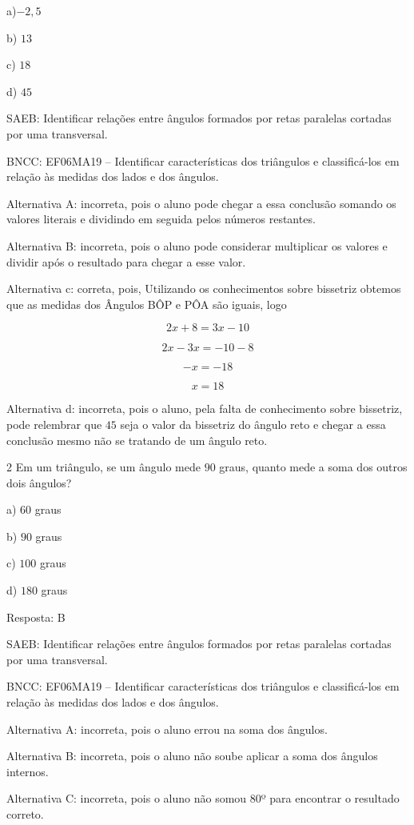 a)$-2,5$

b) $13$

c) $18$

d) $45$

SAEB: Identificar relações entre ângulos formados por retas paralelas
cortadas por uma transversal.

BNCC: EF06MA19 -- Identificar características dos triângulos e
classificá-los em relação às medidas dos lados e dos ângulos.

Alternativa A: incorreta, pois o aluno pode chegar a essa conclusão
somando os valores literais e dividindo em seguida pelos números
restantes.

Alternativa B: incorreta, pois o aluno pode considerar multiplicar os
valores e dividir após o resultado para chegar a esse valor.

Alternativa c: correta, pois, Utilizando os conhecimentos sobre
bissetriz obtemos que as medidas dos Ângulos BÔP e PÔA são iguais, logo

$$2x+8=3x-10$$

$$2x-3x= -10 - 8$$

$$-x = -18$$

$$x = 18$$

Alternativa d: incorreta, pois o aluno, pela falta de conhecimento sobre
bissetriz, pode relembrar que $45$ seja o valor da bissetriz do ângulo
reto e chegar a essa conclusão mesmo não se tratando de um ângulo reto.

\num{2}  Em um triângulo, se um ângulo mede $90$ graus, quanto mede a soma dos
outros dois ângulos?

a) $60$ graus

b) $90$ graus

c) $100$ graus

d) $180$ graus

Resposta: B

SAEB: Identificar relações entre ângulos formados por retas paralelas
cortadas por uma transversal.

BNCC: EF06MA19 -- Identificar características dos triângulos e
classificá-los em relação às medidas dos lados e dos ângulos.

Alternativa A: incorreta, pois o aluno errou na soma dos ângulos.

Alternativa B: incorreta, pois o aluno não soube aplicar a soma dos
ângulos internos.

Alternativa C: incorreta, pois o aluno não somou $80$º para encontrar o
resultado correto.

